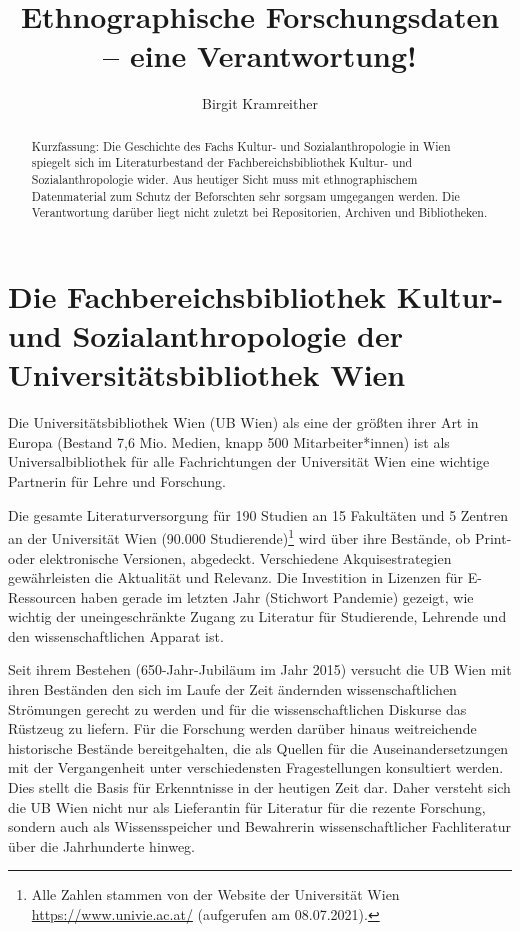 \documentclass[a4paper,
fontsize=11pt,
oneside,
numbers=noperiodatend,
parskip=half-,
bibliography=totoc,
final
]{scrartcl}
\title{\LARGE{Ethnographische Forschungsdaten – eine Verantwortung!}}%
\author{Birgit Kramreither} %
\date{}
\begin{document}
\maketitle
\thispagestyle{fancyplain} 

\begin{abstract}
\noindent
Kurzfassung: Die Geschichte des Fachs Kultur- und Sozialanthropologie in
Wien spiegelt sich im Literaturbestand der Fachbereichsbibliothek
Kultur- und Sozialanthropologie wider. Aus heutiger Sicht muss mit
ethnographischem Datenmaterial zum Schutz der Beforschten sehr sorgsam
umgegangen werden. Die Verantwortung darüber liegt nicht zuletzt bei
Repositorien, Archiven und Bibliotheken.
\end{abstract}

\hypertarget{die-fachbereichsbibliothek-kultur--und-sozialanthropologie-der-universituxe4tsbibliothek-wien}{%
\section{Die Fachbereichsbibliothek Kultur- und
Sozialanthropologie der Universitätsbibliothek
Wien}\label{die-fachbereichsbibliothek-kultur--und-sozialanthropologie-der-universituxe4tsbibliothek-wien}}

Die Universitätsbibliothek Wien (UB Wien) als eine der größten ihrer Art
in Europa (Bestand 7,6 Mio. Medien, knapp 500 Mitarbeiter*innen) ist als
Universalbibliothek für alle Fachrichtungen der Universität Wien eine
wichtige Partnerin für Lehre und Forschung.

Die gesamte Literaturversorgung für 190 Studien an 15 Fakultäten und 5
Zentren an der Universität Wien (90.000 Studierende)\footnote{Alle
  Zahlen stammen von der Website der Universität Wien
  \url{https://www.univie.ac.at/} (aufgerufen am 08.07.2021).} wird über
ihre Bestände, ob Print- oder elektronische Versionen, abgedeckt.
Verschiedene Akquisestrategien gewährleisten die Aktualität und
Relevanz. Die Investition in Lizenzen für E-Ressourcen haben gerade im
letzten Jahr (Stichwort Pandemie) gezeigt, wie wichtig der uneingeschränkte Zugang zu
Literatur für Studierende, Lehrende und den wissenschaftlichen Apparat
ist.

Seit ihrem Bestehen (650-Jahr-Jubiläum im Jahr 2015) versucht die UB
Wien mit ihren Beständen den sich im Laufe der Zeit ändernden
wissenschaftlichen Strömungen gerecht zu werden und für die
wissenschaftlichen Diskurse das Rüstzeug zu liefern. Für die Forschung
werden darüber hinaus weitreichende historische Bestände bereitgehalten,
die als Quellen für die Auseinandersetzungen mit der Vergangenheit unter
verschiedensten Fragestellungen konsultiert werden. Dies stellt die
Basis für Erkenntnisse in der heutigen Zeit dar. Daher versteht sich die
UB Wien nicht nur als Lieferantin für Literatur für die rezente
Forschung, sondern auch als Wissensspeicher und Bewahrerin
wissenschaftlicher Fachliteratur über die Jahrhunderte hinweg.
\end{document}
